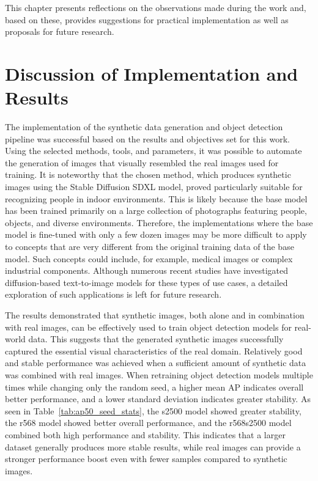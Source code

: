 This chapter presents reflections on the observations made during the work and, based on these, provides suggestions for practical implementation as well as proposals for future research.

\section{Discussion of Implementation and Results}

The implementation of the synthetic data generation and object detection pipeline was successful based on the results and objectives set for this work. Using the selected methods, tools, and parameters, it was possible to automate the generation of images that visually resembled the real images used for training. It is noteworthy that the chosen method, which produces synthetic images using the Stable Diffusion SDXL model, proved particularly suitable for recognizing people in indoor environments. This is likely because the base model has been trained primarily on a large collection of photographs featuring people, objects, and diverse environments. Therefore, the implementations where the base model is fine-tuned with only a few dozen images may be more difficult to apply to concepts that are very different from the original training data of the base model. Such concepts could include, for example, medical images or complex industrial components. Although numerous recent studies have investigated diffusion-based text-to-image models for these types of use cases, a detailed exploration of such applications is left for future research.

The results demonstrated that synthetic images, both alone and in combination with real images, can be effectively used to train object detection models for real-world data. This suggests that the generated synthetic images successfully captured the essential visual characteristics of the real domain. Relatively good and stable performance was achieved when a sufficient amount of synthetic data was combined with real images. When retraining object detection models multiple times while changing only the random seed, a higher mean AP indicates overall better performance, and a lower standard deviation indicates greater stability. As seen in Table~\ref{tab:ap50_seed_stats}, the s2500 model showed greater stability, the r568 model showed better overall performance, and the r568s2500 model combined both high performance and stability. This indicates that a larger dataset generally produces more stable results, while real images can provide a stronger performance boost even with fewer samples compared to synthetic images.

